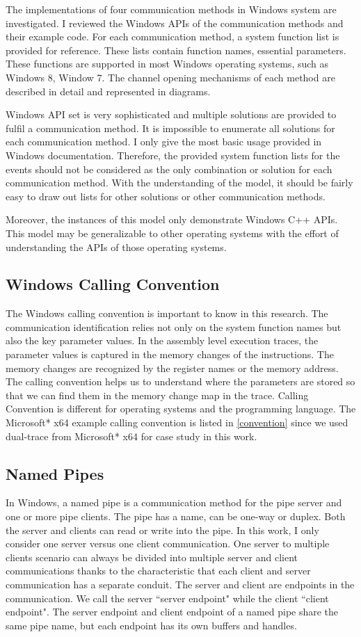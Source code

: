 The implementations of four communication methods in Windows system are investigated. I reviewed the Windows APIs of the communication methods and their example code. For each communication method, a system function list is provided for reference. These lists contain function names, essential parameters. These functions are supported in most Windows operating systems, such as Windows 8, Window 7. The channel opening mechanisms of each method are described in detail and represented in diagrams.

Windows API set is very sophisticated and multiple solutions are provided to fulfil a communication method. It is impossible to enumerate all solutions for each communication method. I only give the most basic usage provided in Windows documentation. Therefore, the provided system function lists for the events should not be considered as the only combination or solution for each communication method. With the understanding of the model, it should be fairly easy to draw out lists for other solutions or other communication methods. 

Moreover, the instances of this model only demonstrate Windows C++ APIs. This model may be generalizable to other operating systems with the effort of understanding the APIs of those operating systems.

\subsection{Windows Calling Convention}
The Windows calling convention is important to know in this research. The communication identification relies not only on the system function names but also the key parameter values. In the assembly level execution traces, the parameter values is captured in the memory changes of the instructions. The memory changes are recognized by the register names or the memory address. The calling convention helps us to understand where the parameters are stored so that we can find them in the memory change map in the trace. Calling Convention is different for operating systems and the programming language. The Microsoft* x64 example calling convention is listed in \ref{convention} since we used dual-trace from Microsoft* x64 for case study in this work.

\subsection{Named Pipes}
In Windows, a named pipe is a communication method for the pipe server and one or more pipe clients. The pipe has a name, can be one-way or duplex. Both the server and clients can read or write into the pipe.\cite{WinNamedpipe} In this work, I only consider one server versus one client communication. One server to multiple clients scenario can always be divided into multiple server and client communications thanks to the characteristic that each client and server communication has a separate conduit. The server and client are endpoints in the communication. We call the server ``server endpoint" while the client ``client endpoint".  The server endpoint and client endpoint of a named pipe share the same pipe name, but each endpoint has its own buffers and handles. 

